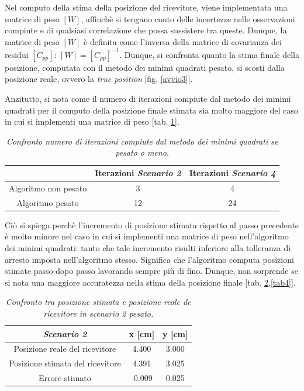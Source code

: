\documentclass[a4paper,11pt,twoside]{book}
\begin{document}
	 Nel computo della stima della posizione del ricevitore, viene implementata una matrice di peso $[W]$, affinchè si tengano conto delle incertezze nelle osservazioni compiute e di qualsiasi correlazione che possa sussistere tra queste. Dunque, la matrice di peso $[W]$ è definita come l'inversa della matrice di covarianza dei residui $[C_{pp}]$: $[W] = [C_{pp}]^{-1}$. Dunque, si confronta quanto la stima finale della posizione, computata con il metodo dei minimi quadrati pesato, si scosti dalla posizione reale, ovvero la \textit{true position} [fig. \ref{avvio3}].
	 
	 Anzitutto, si nota come il numero di iterazioni compiute dal metodo dei minimi quadrati per il computo della posizione finale stimata sia molto maggiore del caso in cui si implementi una matrice di peso [tab. \ref{tab3}].
	 
	 \begin{table}[H]
	 	\begin{center}
	 		\begin{tabular}{|c|c|c|}
	 			\hline
	 			& Iterazioni \textsl{Scenario 2} & Iterazioni \textsl{Scenario 4} \\
	 			\hline
	 			Algoritmo non pesato & 3 & 4 \\
	 			\hline
	 			Algoritmo pesato & 12 & 24 \\
	 			\hline
	 		\end{tabular}
 		 	\caption{\textit{Confronto numero di iterazioni compiute dal metodo dei minimi quadrati se pesato o meno.}}
 		    \label{tab3}
	 	\end{center}
	 \end{table}
	 
	 Ciò si spiega perchè l'incremento di posizione stimata rispetto al passo precedente è molto minore nel caso in cui si implementi una matrice di peso nell'algoritmo dei minimi quadrati: tanto che tale incremento risulti inferiore alla tolleranza di arresto imposta nell'algoritmo stesso. Significa che l'algoritmo computa posizioni stimate passo dopo passo lavorando sempre più di fino. Dunque, non sorprende se si nota una maggiore accuratezza nella stima della posizione finale [tab. \ref{tab5},\ref{tab4}].
	 
	 \begin{table}[H]
	 	\begin{center}
	 		\begin{tabular}{|c|c|c|}
	 			\hline
	 			\textsl{Scenario 2} &  x [cm] & y [cm] \\
	 			\hline
	 			Posizione reale del ricevitore & 4.400 & 3.000 \\
	 			\hline
	 			Posizione stimata del ricevitore & 4.391 & 3.025 \\
	 			\hline
	 			Errore stimato & -0.009 & 0.025 \\
	 			\hline
	 		\end{tabular}
	 		\caption{\textit{Confronto tra posizione stimata e posizione reale de ricevitore in \textsl{scenario 2} pesato.}}
	 		\label{tab5}
	 	\end{center}	
	 \end{table}
\end{document}
